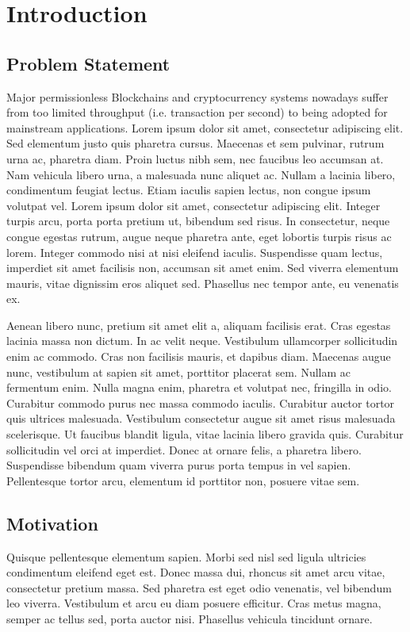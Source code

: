 \section{Introduction}
\subsection{Problem Statement}
Major permissionless Blockchains and cryptocurrency systems \cite{nakamoto2008bitcoin, buterin2014ethereum} nowadays suffer from too limited throughput (i.e. transaction per second) to being adopted for mainstream applications.
Lorem ipsum dolor sit amet, consectetur adipiscing elit. Sed elementum justo quis pharetra cursus. Maecenas et sem pulvinar, rutrum urna ac, pharetra diam. Proin luctus nibh sem, nec faucibus leo accumsan at. Nam vehicula libero urna, a malesuada nunc aliquet ac. Nullam a lacinia libero, condimentum feugiat lectus. Etiam iaculis sapien lectus, non congue ipsum volutpat vel. Lorem ipsum dolor sit amet, consectetur adipiscing elit. Integer turpis arcu, porta porta pretium ut, bibendum sed risus. In consectetur, neque congue egestas rutrum, augue neque pharetra ante, eget lobortis turpis risus ac lorem. Integer commodo nisi at nisi eleifend iaculis. Suspendisse quam lectus, imperdiet sit amet facilisis non, accumsan sit amet enim. Sed viverra elementum mauris, vitae dignissim eros aliquet sed. Phasellus nec tempor ante, eu venenatis ex.

Aenean libero nunc, pretium sit amet elit a, aliquam facilisis erat. Cras egestas lacinia massa non dictum. In ac velit neque. Vestibulum ullamcorper sollicitudin enim ac commodo. Cras non facilisis mauris, et dapibus diam. Maecenas augue nunc, vestibulum at sapien sit amet, porttitor placerat sem. Nullam ac fermentum enim. Nulla magna enim, pharetra et volutpat nec, fringilla in odio. Curabitur commodo purus nec massa commodo iaculis. Curabitur auctor tortor quis ultrices malesuada. Vestibulum consectetur augue sit amet risus malesuada scelerisque. Ut faucibus blandit ligula, vitae lacinia libero gravida quis. Curabitur sollicitudin vel orci at imperdiet. Donec at ornare felis, a pharetra libero. Suspendisse bibendum quam viverra purus porta tempus in vel sapien. Pellentesque tortor arcu, elementum id porttitor non, posuere vitae sem.
\subsection{Motivation}
Quisque pellentesque elementum sapien. Morbi sed nisl sed ligula ultricies condimentum eleifend eget est. Donec massa dui, rhoncus sit amet arcu vitae, consectetur pretium massa. Sed pharetra est eget odio venenatis, vel bibendum leo viverra. Vestibulum et arcu eu diam posuere efficitur. Cras metus magna, semper ac tellus sed, porta auctor nisi. Phasellus vehicula tincidunt ornare.

